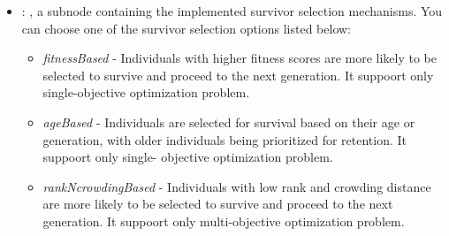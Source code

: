 \begin{itemize}
\begin{itemize}
        \item {}: ,
          a subnode containing the implemented survivor selection mechanisms. You can choose one of
          the survivor selection options listed below:                   \begin{itemize}
          \item \textit{fitnessBased} - Individuals with higher fitness scores are more likely to be
          selected to survive and                     proceed to the next generation. It suppoort
          only single-objective optimization problem.                     \item \textit{ageBased} -
          Individuals are selected for survival based on their age or generation, with older
          individuals being prioritized                     for retention. It suppoort only single-
          objective optimization problem.                     \item \textit{rankNcrowdingBased} -
          Individuals with low rank and crowding distance are more likely to be selected to survive
          and                     proceed to the next generation. It suppoort only multi-objective
          optimization problem.                   \end{itemize}


\end{itemize}
\end{itemize}
